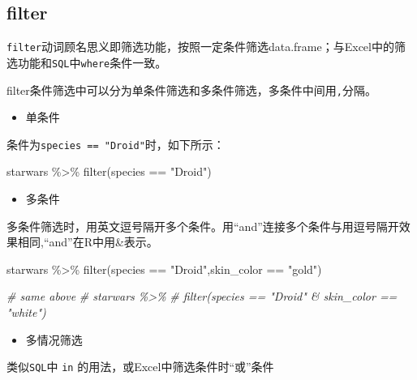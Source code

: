 \documentclass[
]{book}
\newenvironment{Shaded}{\begin{snugshade}}{\end{snugshade}}
\newcommand{\CommentTok}[1]{\textcolor[rgb]{0.56,0.35,0.01}{\textit{#1}}}
\newcommand{\FunctionTok}[1]{\textcolor[rgb]{0.00,0.00,0.00}{#1}}
\newcommand{\NormalTok}[1]{#1}
\newcommand{\SpecialCharTok}[1]{\textcolor[rgb]{0.00,0.00,0.00}{#1}}
\newcommand{\StringTok}[1]{\textcolor[rgb]{0.31,0.60,0.02}{#1}}
\providecommand{\tightlist}{%
  \setlength{\itemsep}{0pt}\setlength{\parskip}{0pt}}
\begin{document}
\hypertarget{filter}{%
\subsection{filter}\label{filter}}

\texttt{filter}动词顾名思义即筛选功能，按照一定条件筛选data.frame；与Excel中的筛选功能和\texttt{SQL}中\texttt{where}条件一致。

filter条件筛选中可以分为单条件筛选和多条件筛选，多条件中间用\texttt{,}分隔。

\begin{itemize}
\tightlist
\item
  单条件
\end{itemize}

条件为\texttt{species\ ==\ "Droid"}时，如下所示：

\begin{Shaded}
\begin{Highlighting}[]
\NormalTok{starwars }\SpecialCharTok{\%\textgreater{}\%} 
  \FunctionTok{filter}\NormalTok{(species }\SpecialCharTok{==} \StringTok{"Droid"}\NormalTok{)}
\end{Highlighting}
\end{Shaded}

\begin{itemize}
\tightlist
\item
  多条件
\end{itemize}

多条件筛选时，用英文逗号隔开多个条件。用``and''连接多个条件与用逗号隔开效果相同,``and''在R中用\&表示。

\begin{Shaded}
\begin{Highlighting}[]
\NormalTok{starwars }\SpecialCharTok{\%\textgreater{}\%} 
  \FunctionTok{filter}\NormalTok{(species }\SpecialCharTok{==} \StringTok{"Droid"}\NormalTok{,skin\_color }\SpecialCharTok{==} \StringTok{"gold"}\NormalTok{)}

\CommentTok{\# same above}
\CommentTok{\# starwars \%\textgreater{}\% }
\CommentTok{\#   filter(species == "Droid" \& skin\_color == "white")}
\end{Highlighting}
\end{Shaded}

\begin{itemize}
\tightlist
\item
  多情况筛选
\end{itemize}

类似\texttt{SQL}中 \texttt{in} 的用法，或Excel中筛选条件时``或''条件
\end{document}
